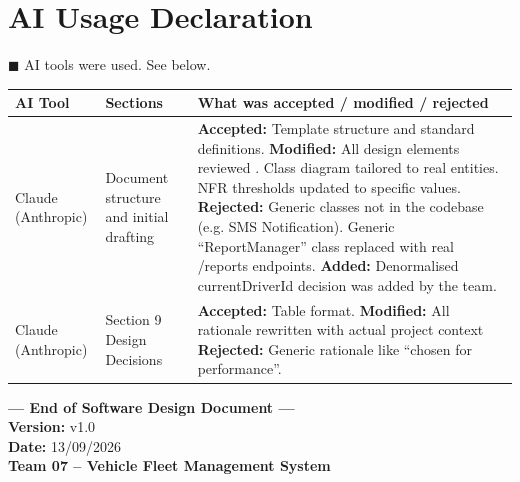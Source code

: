 \documentclass[11pt,a4paper]{article}
\begin{document}
\section{AI Usage Declaration}

$\blacksquare$ AI tools were used. See below.

\begin{table}[H]
\centering
\begin{tabularx}{\textwidth}{|p{2.5cm}|p{3cm}|p{8cm}|}
\hline
\textbf{AI Tool} & \textbf{Sections} & \textbf{What was accepted / modified / rejected} \\
\hline
Claude (Anthropic) & Document structure and initial drafting  & \textbf{Accepted:} Template structure and standard definitions. \textbf{Modified:} All design elements reviewed . Class diagram tailored to real entities. NFR thresholds updated to specific values. \textbf{Rejected:} Generic classes not in the codebase (e.g. SMS Notification). Generic ``ReportManager'' class replaced with real /reports endpoints. \textbf{Added:} Denormalised currentDriverId decision was added by the team. \\
\hline
Claude (Anthropic) & Section 9 Design Decisions & \textbf{Accepted:} Table format. \textbf{Modified:} All rationale rewritten with actual project context  \textbf{Rejected:} Generic rationale like ``chosen for performance''. \\
\hline
\end{tabularx}
\end{table}


\vspace{1cm}

\begin{center}
\textbf{--- End of Software Design Document ---}\\[0.5cm]
\textbf{Version:} v1.0 \\
\textbf{Date:} 13/09/2026 \\
\textbf{Team 07 -- Vehicle Fleet Management System}
\end{center}
\end{document}

